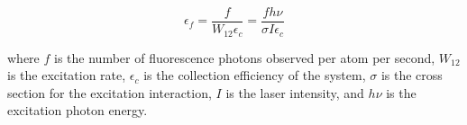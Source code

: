 \begin{equation}
\epsilon_{f} = \frac{f}{W_{12} \epsilon_{c}} = \frac{f h \nu}{\sigma I \epsilon_{c}}
\label{eqn:flueEff}
\end{equation}

\noindent
where $f$ is the number of fluorescence photons observed per atom per second, $W_{12}$ is the excitation rate, $\epsilon_{c}$ is the collection efficiency of the system, $\sigma$ is the cross section for the excitation interaction, $I$ is the laser intensity, and $h \nu$ is the excitation photon energy.  
